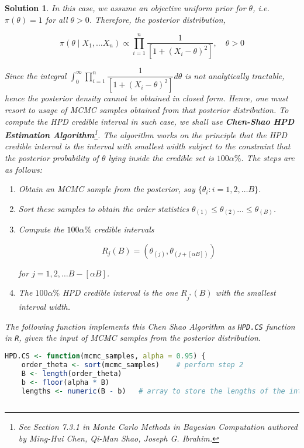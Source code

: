 \documentclass[12pt]{article}
\theoremstyle{problemstyle}
\newtheorem*{solution*}{Solution}
\begin{document}
\begin{solution*}
    In this case, we assume an objective uniform prior for $\theta$, i.e. $\pi(\theta) = 1$ for all $\theta > 0$. Therefore, the posterior distribution,

    $$
    \pi(\theta \mid X_1, \dots X_n) \propto 
    \prod_{i=1}^n \dfrac{1}{[1 + (X_i - \theta)^2]}, \quad \theta > 0
    $$

    Since the integral $\int_{0}^\infty \prod_{i=1}^n \dfrac{1}{[1 + (X_i - \theta)^2]} d\theta$ is not analytically tractable, hence the posterior density cannot be obtained in closed form. Hence, one must resort to usage of MCMC samples obtained from that posterior distribution. To compute the HPD credible interval in such case, we shall use \textbf{Chen-Shao HPD Estimation Algorithm}\footnote{See Section 7.3.1 in Monte Carlo Methods in Bayesian Computation authored by Ming-Hui Chen, Qi-Man Shao, Joseph G. Ibrahim.}. The algorithm works on the principle that the HPD credible interval is the interval with smallest width subject to the constraint that the posterior probability of $\theta$ lying inside the credible set is $100\alpha\%$. The steps are as follows:

    \begin{enumerate}
        \item Obtain an MCMC sample from the posterior, say $\{ \theta_i : i = 1, 2,\dots B \}$.
        \item Sort these samples to obtain the order statistics $\theta_{(1)} \leq \theta_{(2)} \dots \leq \theta_{(B)}$.
        \item Compute the $100\alpha\%$ credible intervals 
        
        $$
        R_j(B) = (\theta_{(j)}, \theta_{(j+[\alpha B] )})
        $$

        for $j = 1, 2, \dots B - [\alpha B]$.
        \item The $100\alpha\%$ HPD credible interval is the one $R_{j^\ast}(B)$ with the smallest interval width.
    \end{enumerate}

    The following function implements this Chen Shao Algorithm as \texttt{HPD.CS} function in \texttt{R}, given the input of MCMC samples from the posterior distribution.

    \begin{lstlisting}[language = R]
HPD.CS <- function(mcmc_samples, alpha = 0.95) {
    order_theta <- sort(mcmc_samples)    # perform step 2
    B <- length(order_theta)   
    b <- floor(alpha * B)
    lengths <- numeric(B - b)   # array to store the lengths of the intervals
    

\end{lstlisting}
\end{solution*}
\end{document}
